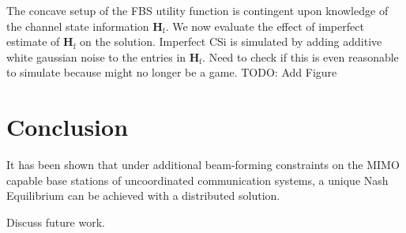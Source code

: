\documentclass[12pt,a4paper]{report}
\begin{document}
The concave setup of the FBS utility function is contingent upon knowledge of the channel state information $\mathbf{H}_{\text{f}}$. We now evaluate the effect of imperfect estimate of $\mathbf{H}_{\text{f}}$ on the solution. Imperfect CSi is simulated by adding additive white gaussian noise to the entries in $\mathbf{H}_{\text{f}}$. Need to check if this is even reasonable to simulate because might no longer be a game. TODO: Add Figure



\chapter{Conclusion}
It has been shown that under additional beam-forming constraints on the MIMO capable base stations of uncoordinated communication systems, a unique Nash Equilibrium can be achieved with a distributed solution. 

Discuss future work. 

\newpage

\end{document}
